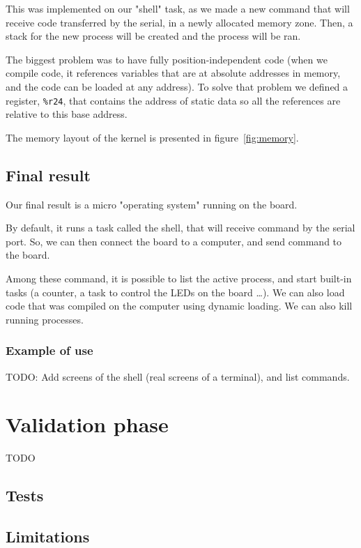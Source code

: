 \documentclass[openany, a4paper]{book}
\begin{document}
      This was implemented on our "shell" task, as we made a new command that
      will receive code transferred by the serial, in a newly allocated
      memory zone.  Then, a stack for the new process will be created and the
      process will be ran.

      The biggest problem was to have fully position-independent code (when
      we compile code, it references variables that are at absolute addresses
      in memory, and the code can be loaded at any address). To solve that
      problem we defined a register, \verb+%r24+, that contains the address of
      static data so all the references are relative to this base address.

      The memory layout of the kernel is presented in figure~\ref{fig:memory}.

    \section{Final result}
      Our final result is a micro "operating system" running on the board.

      By default, it runs a task called the shell, that will receive command by
      the serial port.  So, we can then connect the board to a computer, and
      send command to the board.

      Among these command, it is possible to list the active process, and start
      built-in tasks (a counter, a task to control the LEDs on the board \dots).
      We can also load code that was compiled on the computer using dynamic
      loading. We can also kill running processes.

      \subsection{Example of use}
        TODO: Add screens of the shell (real screens of a terminal), and list
        commands.

  \chapter{Validation phase}
    TODO
    \section{Tests}

    \section{Limitations}
\end{document}
